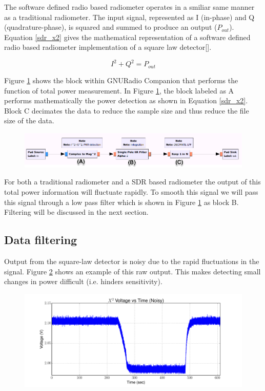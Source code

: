 The software defined radio based radiometer operates in a smiliar same manner as a traditional radiometer.  The input signal, represented as I (in-phase) and Q (quadrature-phase), is squared and summed to produce an output ($P_{out}$).  Equation \ref{sdr_x2} gives the mathematical representation of a software defined radio based radiometer implementation of a square law detector[\cite{Rashid}]. 

\begin{equation}\label{sdr_x2}
I^2+Q^2 = P_{out}
\end{equation}

Figure \ref{square_block} shows the block within GNURadio Companion that performs the function of total power measurement.  In Figure \ref{square_block}, the block labeled as A performs mathematically the power detection as shown in Equation \ref{sdr_x2}.  Block C decimates the data to reduce the sample size and thus reduce the file size of the data.  

{\begin{figure}[h!tb] 
\centering
\includegraphics[width=17cm]{Images/TPR_grc.png}
\label{square_block}
\end{figure}
}

For both a traditional radiometer and a SDR based radiometer the output of this total power information will fluctuate rapidly.  To smooth this signal we will pass this signal through a low pass filter which is shown in Figure \ref{square_block} as block B.  Filtering will be discussed in the next section.

\subsection{Data filtering}

Output from the square-law detector is noisy due to the rapid fluctuations in the signal.  Figure \ref{square_raw} shows an example of this raw output.  This makes detecting small changes in power difficult (i.e. hinders sensitivity).  

{\begin{figure}[h!tb] 
\centering
\includegraphics[width=17cm]{Experiments/Exp1/noisy_voltage.pdf}
\label{square_raw}
\end{figure}
}

